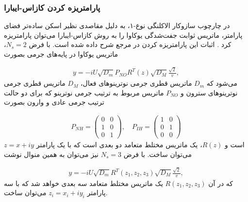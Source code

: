 \documentclass[a4paper]{book}
\begin{document}
\subsubsection{پارامتریزه کردن کازاس-ایبارا}
در چارچوب سازوکار الاکلنگی نوع-۱، به دلیل مقاصدی نظیر اسکن ساده‌تر فضای پارامتر، ماتریس ثوابت جفت‌شدگی یوکاوا را به روش کازاس-ایبارا می‌توان پارامتریزه کرد \cite{Casas:2001sr}. اثبات این پارامتریزه کردن در مرجع \cite{Lopez-Pavon:2015cga} شرح داده شده است. با فرض {\footnotesize$N_s=2$}، ماتریس یوکاوا در پایه‌های جرمی بصورت
\par
\vspace{-0.5cm}
{\footnotesize\begin{align}
	y=-iU\sqrt{D_m} P_{NO} R^T(z) \sqrt{D_M} \frac{\sqrt{2}}{v},
	\label{eq:Casas-Ibarra-2}
\end{align}}
می‌شود که {\footnotesize$D_m$} ماتریس قطری جرمی نوترینوهای فعال، {\footnotesize$D_M$} ماتریس قطری جرمی نوترینوهای سترون و {\footnotesize$P_{NO}$} ماتریس مربوط به ترتیب جرمی نوترینو که برای دو حالت ترتیب جرمی عادی و وارون بصورت
\par
\vspace{-0.5cm}
{\footnotesize\begin{align}
	P_{NH}=\begin{pmatrix}
		0&0\\
		1&0\\
		0&1
	\end{pmatrix}, \quad
	P_{IH}=\begin{pmatrix}
		1&0\\
		0&1\\
		0&0
	\end{pmatrix}
\end{align}}
است و {\footnotesize$R(z)$}، یک ماتریس مختلط متعامد دو بعدی است که با یک پارامتر {\footnotesize$z=x+iy$} می‌توان ساخت. با فرض {\footnotesize$N_s=3$} نیز می‌توان به همین منوال نوشت
\par
\vspace{-0.5cm}
{\footnotesize\begin{align}
	y=-iU\sqrt{D_m} R^T(z_1,z_2,z_3) \sqrt{D_M} \frac{\sqrt{2}}{v},
	\label{eq:Casas-Ibarra-3}
\end{align}}
که در آن {\footnotesize$R(z_1,z_2,z_3)$} یک ماتریس مختلط متعامد سه بعدی خواهد شد که با سه پارامتر {\footnotesize$z_i=x_i+iy_i$} می‌توان ساخت.
				
\end{document}
